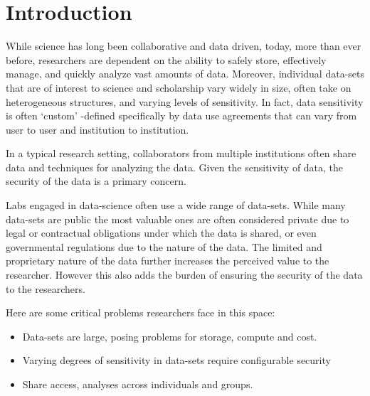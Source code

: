 \section{Introduction}



While science has long been collaborative and data driven, today, more than ever before, researchers are dependent on the ability to safely store, effectively manage, and quickly analyze vast amounts of
data. Moreover, individual data-sets that are of interest to science and scholarship vary widely in size, often take on heterogeneous structures, and varying levels of sensitivity. In fact, data sensitivity is often `custom' -defined specifically by
data use agreements that can vary from user to user and institution to institution. 

In a typical research setting, collaborators from multiple institutions often share data and techniques
for analyzing the data. Given the sensitivity of data, the security of the data is a primary concern.


Labs engaged in data-science often use a wide range of data-sets. While many data-sets are public the most
valuable ones are often considered private due to legal or contractual obligations under which the data
is shared, or even governmental regulations due to the nature of the data. The limited and proprietary nature
of the data further increases the perceived value to the researcher. However this also adds the burden of
ensuring the security of the data to the researchers.


Here are some critical problems researchers face in this space:

\begin{itemize}
\item Data-sets are large, posing problems for storage, compute and cost.
\item Varying degrees of sensitivity in data-sets require configurable security
\item Share access, analyses across individuals and groups.
\end{itemize}





